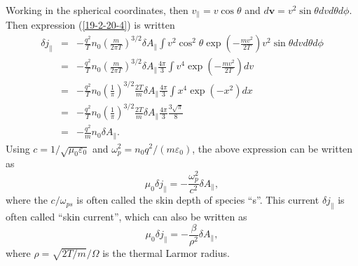 \documentclass{llncs}
\begin{document}
Working in the spherical coordinates, then $v_{\parallel} = v \cos \theta$ and
$d\mathbf{v}= v^2 \sin \theta d v d \theta d \phi$. Then expression
(\ref{19-2-20-4}) is written
\begin{eqnarray}
  \delta j_{\parallel} & = & - \frac{q^2}{T} n_0 \left( \frac{m}{2 \pi T}
  \right)^{3 / 2} \delta A_{\parallel} \int v^2 \cos^2 \theta \exp \left( -
  \frac{m v^2}{2 T} \right) v^2 \sin \theta d v d \theta d \phi \nonumber\\
  & = & - \frac{q^2}{T} n_0 \left( \frac{m}{2 \pi T} \right)^{3 / 2} \delta
  A_{\parallel} \frac{4 \pi}{3} \int v^4 \exp \left( - \frac{m v^2}{2 T}
  \right) d v \nonumber\\
  & = & - \frac{q^2}{T} n_0 \left( \frac{1}{\pi} \right)^{3 / 2} \frac{2
  T}{m} \delta A_{\parallel} \frac{4 \pi}{3} \int x^4 \exp (- x^2) d x
  \nonumber\\
  & = & - \frac{q^2}{T} n_0 \left( \frac{1}{\pi} \right)^{3 / 2} \frac{2
  T}{m} \delta A_{\parallel} \frac{4 \pi}{3} \frac{3 \sqrt{\pi}}{8}
  \nonumber\\
  & = & - \frac{q^2}{m} n_0 \delta A_{\parallel} . 
\end{eqnarray}
Using $c = 1 / \sqrt{\mu_0 \varepsilon_0}$ and $\omega_p^2 = n_0 q^2 / (m
\varepsilon_0)$, the above expression can be written as
\begin{equation}
  \mu_0 \delta j_{\parallel} = - \frac{\omega_p^2}{c^2} \delta A_{\parallel},
\end{equation}
where the $c / \omega_{p s}$ is often called the skin depth of species ``s''.
This current $\delta j_{\parallel}$ is often called ``skin current'', which
can also be written as
\begin{equation}
  \mu_0 \delta j_{\parallel} = - \frac{\beta}{\rho^2} \delta A_{\parallel},
\end{equation}
where $\rho = \sqrt{2 T / m} / \Omega$ is the thermal Larmor radius.
\end{document}

